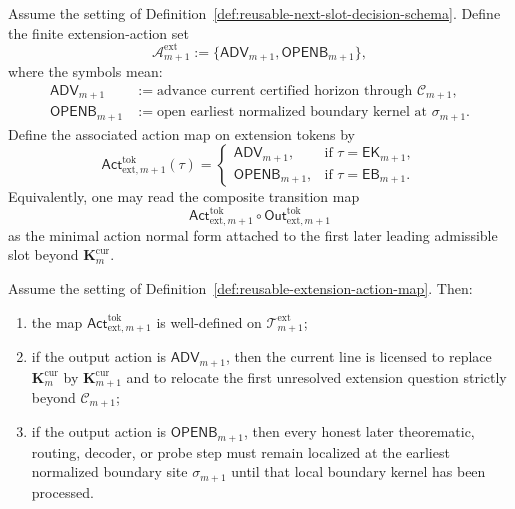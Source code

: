 \begin{definition}
\label{def:reusable-extension-action-map}
Assume the setting of Definition~\ref{def:reusable-next-slot-decision-schema}. Define the finite extension-action set
\[
 \mathcal A^{\mathrm{ext}}_{m+1}
 :=
 \{\mathsf{ADV}_{m+1},\mathsf{OPENB}_{m+1}\},
\]
where the symbols mean:
\begin{align*}
 \mathsf{ADV}_{m+1} &:= \text{advance current certified horizon through }\mathcal C_{m+1},\\
 \mathsf{OPENB}_{m+1} &:= \text{open earliest normalized boundary kernel at }\sigma_{m+1}.
\end{align*}
Define the associated action map on extension tokens by
\[
 \mathsf{Act}^{\mathrm{tok}}_{\mathrm{ext},m+1}(\tau)
 =
 \begin{cases}
 \mathsf{ADV}_{m+1}, & \text{if }\tau=\mathsf{EK}_{m+1},\\[2mm]
 \mathsf{OPENB}_{m+1}, & \text{if }\tau=\mathsf{EB}_{m+1}.
 \end{cases}
\]
Equivalently, one may read the composite transition map
\[
 \mathsf{Act}^{\mathrm{tok}}_{\mathrm{ext},m+1}\circ \mathsf{Out}^{\mathrm{tok}}_{\mathrm{ext},m+1}
\]
as the minimal action normal form attached to the first later leading admissible slot beyond \(\mathbf K_m^{\mathrm{cur}}\).
\end{definition}

\begin{proposition}
\label{prop:extension-token-language-determines-next-honest-action}
Assume the setting of Definition~\ref{def:reusable-extension-action-map}. Then:
\begin{enumerate}[label=(\roman*)]
 \item the map \(\mathsf{Act}^{\mathrm{tok}}_{\mathrm{ext},m+1}\) is well-defined on \(\mathcal T^{\mathrm{ext}}_{m+1}\);
 \item if the output action is \(\mathsf{ADV}_{m+1}\), then the current line is licensed to replace \(\mathbf K_m^{\mathrm{cur}}\) by \(\mathbf K_{m+1}^{\mathrm{cur}}\) and to relocate the first unresolved extension question strictly beyond \(\mathcal C_{m+1}\);
 \item if the output action is \(\mathsf{OPENB}_{m+1}\), then every honest later theorematic, routing, decoder, or probe step must remain localized at the earliest normalized boundary site \(\sigma_{m+1}\) until that local boundary kernel has been processed.
\end{enumerate}
\end{proposition}

